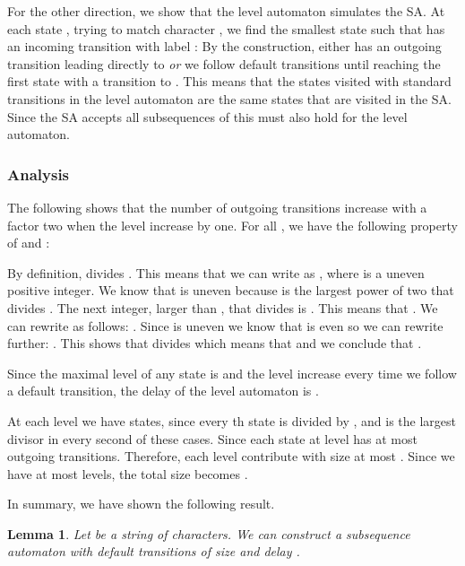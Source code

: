 \documentclass[a4paper,11pt]{article}
\newtheorem{lemma}{Lemma}
\begin{document}
For the other direction, we show that the level automaton simulates the SA. At each state , trying to match character , we find the smallest state  such that  has an incoming transition with label : By the construction, either  has an outgoing transition leading directly to  \emph{or} we follow default transitions until reaching the first state with a transition to . This means that the states visited with standard transitions in the level automaton are the same states that are visited in the SA. Since the SA accepts all subsequences of  this must also hold for the level automaton.












\subsubsection{Analysis}
The following shows that the number of outgoing transitions increase with a factor two when the level increase by one.
For all , we have the following property of  and :

By definition,  divides . This means that we can write  as  , where  is a uneven positive integer. We know that  is uneven because  is the largest power of two that divides . The next integer, larger than , that  divides is . This means that . We can rewrite  as follows: . Since  is uneven we know that  is even so we can rewrite  further: . This shows that  divides  which means that  and we conclude that .

Since the maximal level of any state is  and the level increase every time we follow a default transition, the delay of the level automaton is .







At each level  we have  states, since every th state is divided by , and  is the largest divisor in every second of these cases. Since  each state at level  has at most  outgoing transitions. Therefore, each level contribute with size at most . Since we have at most  levels, the total size becomes .

In summary, we have shown the following result.
\begin{lemma}\label{lemma:levelaut}
Let  be a string of  characters. We can construct a subsequence automaton with default transitions of size  and delay .
\end{lemma}
\end{document}
